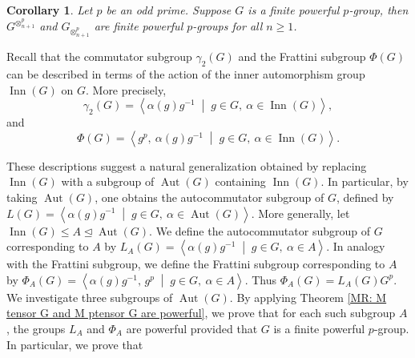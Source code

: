 \documentclass[12pt]{elsarticle}
\newtheorem*{corollary*}{Corollary}
\newtheorem*{main corollary*}{Main Corollary}
\theoremstyle{definition}
\begin{document}
\begin{corollary*}  \label{MR: Tensors are powerful}
	Let $p$ be an odd prime. Suppose $G$ is a finite powerful $p$-group, then $G^{\otimes^p_{n+1}}$ and $G_{\otimes^p_{n+1}}$ are finite powerful $p$-groups for all $n\geq 1$. 
\end{corollary*} 

Recall that the commutator subgroup
$\gamma_2(G)$ and the Frattini subgroup $\Phi(G)$ can be described in
terms of the action of the inner automorphism group $\operatorname{Inn}(G)$
on $G$. More precisely,
\[
\gamma_2(G)
=
\left\langle
\alpha(g)g^{-1}
\;\middle|\;
g\in G,\ \alpha\in\operatorname{Inn}(G)
\right\rangle,
\]
and
\[
\Phi(G)
=
\left\langle
g^p,\ \alpha(g)g^{-1}
\;\middle|\;
g\in G,\ \alpha\in\operatorname{Inn}(G)
\right\rangle.
\]

These descriptions suggest a natural generalization obtained by replacing
$\operatorname{Inn}(G)$ with a subgroup of $\operatorname{Aut}(G)$
containing $\operatorname{Inn}(G)$. In particular, by taking $\operatorname{Aut}(G)$, one obtains the
autocommutator subgroup of $G$, defined by $L(G)=
\left\langle
\alpha(g)g^{-1}
\;\middle|\;
g\in G,\ \alpha\in\operatorname{Aut}(G)
\right\rangle.$ More generally, let $\operatorname{Inn}(G)\leq A\unlhd\operatorname{Aut}(G).$
We define the autocommutator subgroup of $G$ corresponding to $A$ by $L_A(G)
=
\left\langle
\alpha(g)g^{-1}
\;\middle|\;
g\in G,\ \alpha\in A
\right\rangle.$ In analogy with the Frattini subgroup, we define the Frattini subgroup corresponding to $A$ by $\Phi_A(G)=
\left\langle
\alpha(g)g^{-1},\,g^p
\;\middle|\;
g\in G,\ \alpha\in A
\right\rangle.$ Thus $\Phi_A(G)=L_A(G)G^p$.
We investigate three subgroups of $\operatorname{Aut}(G)$. By applying Theorem \ref{MR: M tensor G and M ptensor G are powerful}, we prove that for each such subgroup $A$, the groups $L_A$ and $\Phi_A$ are powerful provided that $G$ is a finite powerful $p$-group. In particular, we prove that
\end{document}
